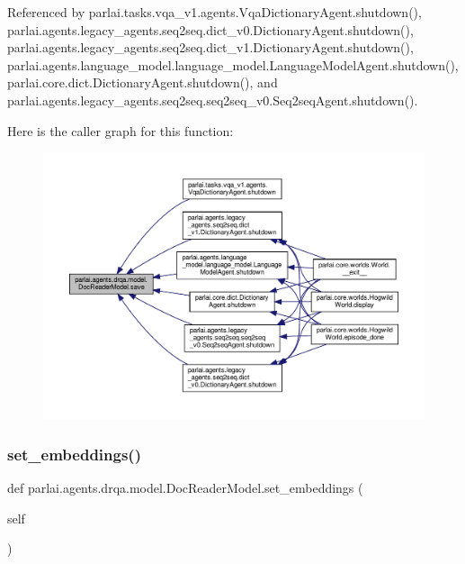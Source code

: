 Referenced by parlai.\+tasks.\+vqa\+\_\+v1.\+agents.\+Vqa\+Dictionary\+Agent.\+shutdown(), parlai.\+agents.\+legacy\+\_\+agents.\+seq2seq.\+dict\+\_\+v0.\+Dictionary\+Agent.\+shutdown(), parlai.\+agents.\+legacy\+\_\+agents.\+seq2seq.\+dict\+\_\+v1.\+Dictionary\+Agent.\+shutdown(), parlai.\+agents.\+language\+\_\+model.\+language\+\_\+model.\+Language\+Model\+Agent.\+shutdown(), parlai.\+core.\+dict.\+Dictionary\+Agent.\+shutdown(), and parlai.\+agents.\+legacy\+\_\+agents.\+seq2seq.\+seq2seq\+\_\+v0.\+Seq2seq\+Agent.\+shutdown().

Here is the caller graph for this function\+:
\nopagebreak
\begin{figure}[H]
\begin{center}
\leavevmode
\includegraphics[width=350pt]{classparlai_1_1agents_1_1drqa_1_1model_1_1DocReaderModel_af50a0adfb1e85342655305813c814f86_icgraph}
\end{center}
\end{figure}
\mbox{\label{classparlai_1_1agents_1_1drqa_1_1model_1_1DocReaderModel_a6d563b82872da6b70b2801f2acfcac32}} 
\subsubsection{\texorpdfstring{set\+\_\+embeddings()}{set\_embeddings()}}
{\footnotesize\ttfamily def parlai.\+agents.\+drqa.\+model.\+Doc\+Reader\+Model.\+set\+\_\+embeddings (\begin{DoxyParamCaption}\item[{}]{self }\end{DoxyParamCaption})}



